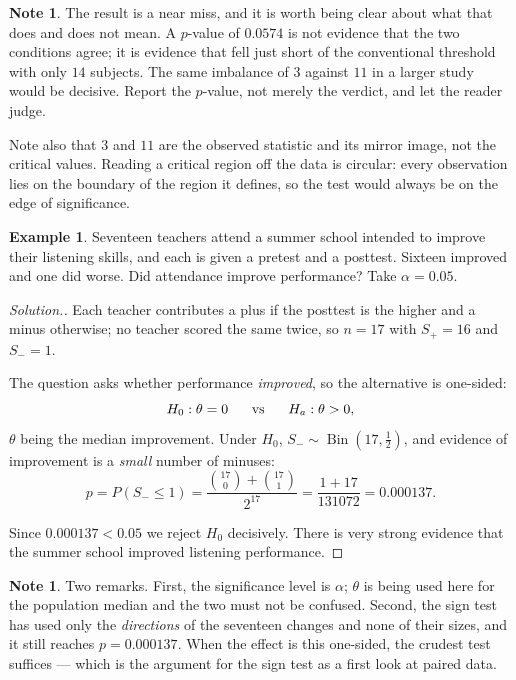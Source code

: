 \documentclass[11pt,a4paper]{article}
\theoremstyle{definition}
\newtheorem{example}[thm]{Example}
\newtheorem{note}[thm]{Note}
\newenvironment{solution}
  {\renewcommand{\qedsymbol}{}\begin{proof}[\textit{Solution}.]}
  {\end{proof}}
\begin{document}
\begin{note}
The result is a near miss, and it is worth being clear about what that does and
does not mean. A $p$-value of $0.0574$ is not evidence that the two conditions
agree; it is evidence that fell just short of the conventional threshold with only
$14$ subjects. The same imbalance of $3$ against $11$ in a larger study would be
decisive. Report the $p$-value, not merely the verdict, and let the reader judge.

Note also that $3$ and $11$ are the observed statistic and its mirror image, not
the critical values. Reading a critical region off the data is circular: every
observation lies on the boundary of the region it defines, so the test would
always be on the edge of significance.
\end{note}













\begin{example}
Seventeen teachers attend a summer school intended to improve their listening
skills, and each is given a pretest and a posttest. Sixteen improved and one did
worse. Did attendance improve performance? Take $\alpha=0.05$.
\end{example}

\begin{solution}
Each teacher contributes a plus if the posttest is the higher and a minus
otherwise; no teacher scored the same twice, so $n=17$ with $S_+=16$ and $S_-=1$.

The question asks whether performance \emph{improved}, so the alternative is
one-sided:
$$H_0:\theta=0\hspace{0.6cm}\text{vs}\hspace{0.6cm}H_a:\theta>0 ,$$
$\theta$ being the median improvement. Under $H_0$,
$S_-\sim\operatorname{Bin}\left(17,\tfrac{1}{2}\right)$, and evidence of
improvement is a \emph{small} number of minuses:
$$p=P\left(S_-\leq 1\right)=\dfrac{\binom{17}{0}+\binom{17}{1}}{2^{17}}
=\dfrac{1+17}{131072}=0.000137 .$$

Since $0.000137<0.05$ we reject $H_0$ decisively. There is very strong evidence
that the summer school improved listening performance.
\end{solution}

\begin{note}
Two remarks. First, the significance level is $\alpha$; $\theta$ is being used here
for the population median and the two must not be confused. Second, the sign test
has used only the \emph{directions} of the seventeen changes and none of their
sizes, and it still reaches $p=0.000137$. When the effect is this one-sided, the
crudest test suffices --- which is the argument for the sign test as a first look at
paired data.
\end{note}
\end{document}

